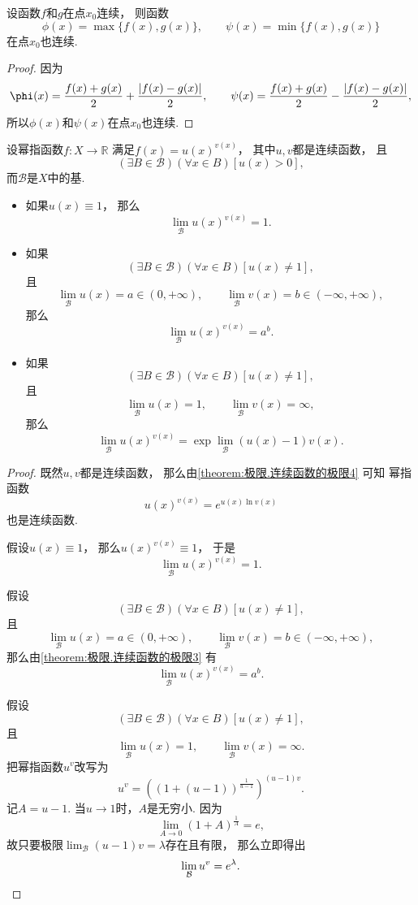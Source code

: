 \begin{proposition}
设函数\(f\)和\(g\)在点\(x_0\)连续，
则函数\[
	\phi(x) = \max\{f(x),g(x)\}, \qquad
	\psi(x) = \min\{f(x),g(x)\}
\]在点\(x_0\)也连续.
\begin{proof}
因为\[
	\phi(x)
	= \frac{f(x)+g(x)}{2}+\frac{\abs{f(x)-g(x)}}{2}, \qquad
	\psi(x)
	= \frac{f(x)+g(x)}{2}-\frac{\abs{f(x)-g(x)}}{2},
\]
所以\(\phi(x)\)和\(\psi(x)\)在点\(x_0\)也连续.
\end{proof}
\end{proposition}

\begin{proposition}[幂指函数的极限]\label{theorem:幂指函数.幂指函数的极限}
设幂指函数\(f\colon X\to\mathbb{R}\)
满足\(f(x) = u(x)^{v(x)}\)，
其中\(u,v\)都是连续函数，
且\begin{equation*}
	(\exists B\in\mathcal{B})
	(\forall x \in B)
	[u(x)>0],
\end{equation*}
而\(\mathcal{B}\)是\(X\)中的基.
\begin{itemize}
	\item 如果\(u(x) \equiv 1\)，
	那么\[
		\lim_\mathcal{B} u(x)^{v(x)} = 1.
	\]

	\item 如果\[
		(\exists B\in\mathcal{B})
		(\forall x \in B)
		[u(x)\neq1],
	\]且\[
		\lim_\mathcal{B} u(x) = a \in (0,+\infty), \qquad
		\lim_\mathcal{B} v(x) = b \in (-\infty,+\infty),
	\]
	那么\[
		\lim_\mathcal{B} u(x)^{v(x)} = a^b.
	\]

	\item 如果\[
		(\exists B\in\mathcal{B})
		(\forall x \in B)
		[u(x)\neq1],
	\]且\[
		\lim_\mathcal{B} u(x) = 1, \qquad
		\lim_\mathcal{B} v(x) = \infty,
	\]
	那么\[
		\lim_\mathcal{B} u(x)^{v(x)}
		= \exp\lim_\mathcal{B} (u(x)-1) v(x).
	\]
\end{itemize}
\begin{proof}
既然\(u,v\)都是连续函数，
那么由\cref{theorem:极限.连续函数的极限4} 可知
幂指函数\[
	u(x)^{v(x)} = e^{u(x) \ln v(x)}
\]也是连续函数.

假设\(u(x) \equiv 1\)，
那么\(u(x)^{v(x)} \equiv 1\)，
于是\[
	\lim_\mathcal{B} u(x)^{v(x)} = 1.
\]

假设\[
	(\exists B\in\mathcal{B})
	(\forall x \in B)
	[u(x)\neq1],
\]且\[
	\lim_\mathcal{B} u(x) = a \in (0,+\infty), \qquad
	\lim_\mathcal{B} v(x) = b \in (-\infty,+\infty),
\]
那么由\cref{theorem:极限.连续函数的极限3} 有\[
	\lim_\mathcal{B} u(x)^{v(x)} = a^b.
\]

假设\[
	(\exists B\in\mathcal{B})
	(\forall x \in B)
	[u(x)\neq1],
\]且\[
	\lim_\mathcal{B} u(x) = 1, \qquad
	\lim_\mathcal{B} v(x) = \infty.
\]
把幂指函数\(u^v\)改写为\[
	u^v = \left((1+(u-1))^{\frac1{u-1}}\right)^{(u-1)v}.
\]
记\(A = u - 1\).
当\(u \to 1\)时，\(A\)是无穷小.
因为\[
	\lim_{A\to0} (1+A)^{\frac1A} = e,
\]
故只要极限\(\lim_\mathcal{B} (u-1) v = \lambda\)存在且有限，
那么立即得出\[
	\lim_\mathcal{B} u^v = e^\lambda.
	\qedhere
\]
\end{proof}
\end{proposition}

